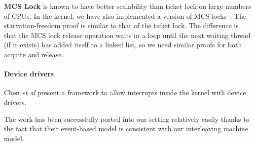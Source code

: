 \ignore{
\begin{figure}
 = C, multicols=2] {source_code/mcs_lock.c}
\caption{MCS Lock Implementation}
\label{fig:exp:mcs_lock}
\end{figure}
}

\textbf{MCS Lock} is known to have better scalability than ticket lock
on large numbers of CPUs.
In the {\mCTOS} kernel, we have also implemented a version of MCS 
locks~\cite{Mellor-Crummey:mcs-locks}.
The starvation-freedom proof is similar to that of the ticket lock. 
The difference is that the MCS lock release operation waits in a loop until the next waiting thread (if it exists)
has added itself to a linked list, so we need similar proofs for both acquire and release.

\vspace{-3pt}
\paragraph{Device drivers}
\label{sec:base:device}
Chen {\it et al} \cite{chen16} present a framework to allow interrupts
inside the kernel
with device drivers.  The work has been successfully ported
into our setting relatively easily thanks to the fact that their event-based
 model is consistent with our interleaving machine model.




